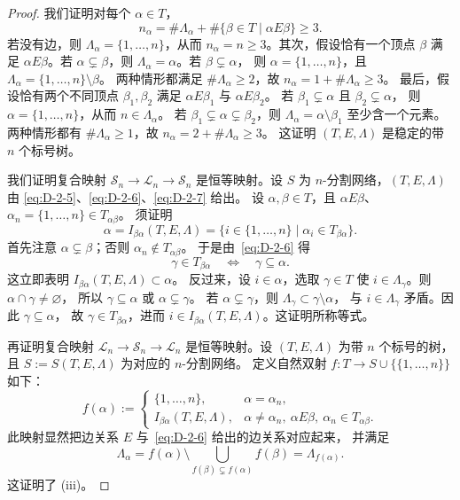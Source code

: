 \begin{proof}
我们证明对每个 $\alpha\in T$，
\[
  n_\alpha=\#\Lambda_\alpha
  +\#\{\beta\in T\mid\alpha E\beta\}\ge3.
\]
若没有边，则 $\Lambda_\alpha=\{1,\ldots,n\}$，从而
$n_\alpha=n\ge3$。其次，假设恰有一个顶点 $\beta$ 满足
$\alpha E\beta$。若 $\alpha\subsetneq\beta$，则
$\Lambda_\alpha=\alpha$。若 $\beta\subsetneq\alpha$，
则 $\alpha=\{1,\ldots,n\}$，且
$\Lambda_\alpha=\{1,\ldots,n\}\setminus\beta$。
两种情形都满足 $\#\Lambda_\alpha\ge2$，故
$n_\alpha=1+\#\Lambda_\alpha\ge3$。
最后，假设恰有两个不同顶点 $\beta_1,\beta_2$ 满足
$\alpha E\beta_1$ 与 $\alpha E\beta_2$。
若 $\beta_1\subsetneq\alpha$ 且 $\beta_2\subsetneq\alpha$，
则 $\alpha=\{1,\ldots,n\}$，从而 $n\in\Lambda_\alpha$。
若 $\beta_1\subsetneq\alpha\subsetneq\beta_2$，则
$\Lambda_\alpha=\alpha\setminus\beta_1$ 至少含一个元素。
两种情形都有 $\#\Lambda_\alpha\ge1$，故
$n_\alpha=2+\#\Lambda_\alpha\ge3$。
这证明 $(T,E,\Lambda)$ 是稳定的带 $n$ 个标号树。

我们证明复合映射 $\mathcal S_n\to\mathcal L_n\to\mathcal S_n$
是恒等映射。设 $S$ 为 $n$-分割网络，$(T,E,\Lambda)$ 由
\eqref{eq:D-2-5}、\eqref{eq:D-2-6}、\eqref{eq:D-2-7} 给出。
设 $\alpha,\beta\in T$，且 $\alpha E\beta$、
$\alpha_n=\{1,\ldots,n\}\in T_{\alpha\beta}$。
须证明
\[
  \alpha=I_{\beta\alpha}(T,E,\Lambda)
  =\{i\in\{1,\ldots,n\}\mid\alpha_i\in T_{\beta\alpha}\}.
\]
首先注意 $\alpha\subsetneq\beta$；否则 $\alpha_n\notin T_{\alpha\beta}$。
于是由~\eqref{eq:D-2-6} 得
\[
  \gamma\in T_{\beta\alpha}\quad\Longleftrightarrow\quad
  \gamma\subseteq\alpha.
\]
这立即表明 $I_{\beta\alpha}(T,E,\Lambda)\subset\alpha$。
反过来，设 $i\in\alpha$，选取 $\gamma\in T$ 使
$i\in\Lambda_\gamma$。则 $\alpha\cap\gamma\ne\varnothing$，
所以 $\gamma\subseteq\alpha$ 或 $\alpha\subsetneq\gamma$。
若 $\alpha\subsetneq\gamma$，则
$\Lambda_\gamma\subset\gamma\setminus\alpha$，
与 $i\in\Lambda_\gamma$ 矛盾。因此 $\gamma\subseteq\alpha$，
故 $\gamma\in T_{\beta\alpha}$，进而
$i\in I_{\beta\alpha}(T,E,\Lambda)$。这证明所称等式。

再证明复合映射 $\mathcal L_n\to\mathcal S_n\to\mathcal L_n$
是恒等映射。设 $(T,E,\Lambda)$ 为带 $n$ 个标号的树，
且 $S:=S(T,E,\Lambda)$ 为对应的 $n$-分割网络。
定义自然双射
$f:T\to S\cup\{\{1,\ldots,n\}\}$ 如下：
\[
  f(\alpha):=\begin{cases}
    \{1,\ldots,n\},&\alpha=\alpha_n,\\
    I_{\beta\alpha}(T,E,\Lambda),
       &\alpha\ne\alpha_n,\ \alpha E\beta,\
        \alpha_n\in T_{\alpha\beta}.
  \end{cases}
\]
此映射显然把边关系 $E$ 与~\eqref{eq:D-2-6} 给出的边关系对应起来，
并满足
\[
  \Lambda_\alpha=f(\alpha)\setminus
  \bigcup_{f(\beta)\subsetneq f(\alpha)}f(\beta)
  =\Lambda_{f(\alpha)}.
\]
这证明了 (iii)。


\end{proof}
